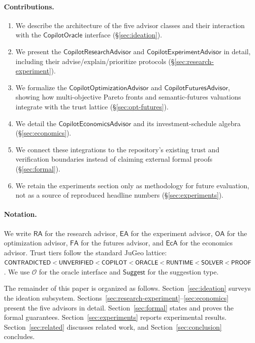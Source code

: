 \documentclass[11pt]{article}
\newcommand{\RA}{\mathsf{RA}}
\newcommand{\EA}{\mathsf{EA}}
\newcommand{\OA}{\mathsf{OA}}
\newcommand{\FA}{\mathsf{FA}}
\newcommand{\EcA}{\mathsf{EcA}}
\newcommand{\Oracle}{\mathcal{O}}
\newcommand{\Suggest}{\mathsf{Suggest}}
\begin{document}
\paragraph{Contributions.}
\begin{enumerate}
  \item We describe the architecture of the five advisor classes
        and their interaction with the
        $\mathsf{CopilotOracle}$ interface
        (\S\ref{sec:ideation}).
  \item We present the $\mathsf{CopilotResearchAdvisor}$ and
        $\mathsf{CopilotExperimentAdvisor}$ in detail, including
        their advise/explain/prioritize protocols
        (\S\ref{sec:research-experiment}).
  \item We formalize the $\mathsf{CopilotOptimizationAdvisor}$
        and $\mathsf{CopilotFuturesAdvisor}$, showing how
        multi-objective Pareto fronts and semantic-futures
        valuations integrate with the trust lattice
        (\S\ref{sec:opt-futures}).
  \item We detail the $\mathsf{CopilotEconomicsAdvisor}$ and its
        investment-schedule algebra
        (\S\ref{sec:economics}).
  \item We connect these integrations to the repository's existing trust
        and verification boundaries instead of claiming external formal
        proofs (\S\ref{sec:formal}).
  \item We retain the experiments section only as methodology for future
        evaluation, not as a source of reproduced headline numbers
        (\S\ref{sec:experiments}).
\end{enumerate}

\paragraph{Notation.}
We write $\RA$ for the research advisor, $\EA$ for the experiment
advisor, $\OA$ for the optimization advisor, $\FA$ for the
futures advisor, and $\EcA$ for the economics advisor.  Trust
tiers follow the standard JuGeo lattice:
$\mathsf{CONTRADICTED} < \mathsf{UNVERIFIED} < \mathsf{COPILOT} < \mathsf{ORACLE} < \mathsf{RUNTIME} <
\mathsf{SOLVER} < \mathsf{PROOF}$.  We use $\Oracle$ for the oracle interface
and $\Suggest$ for the suggestion type.

The remainder of this paper is organized as follows.
Section~\ref{sec:ideation} surveys the ideation subsystem.
Sections~\ref{sec:research-experiment}--\ref{sec:economics}
present the five advisors in detail.
Section~\ref{sec:formal} states and proves the formal guarantees.
Section~\ref{sec:experiments} reports experimental results.
Section~\ref{sec:related} discusses related work, and
Section~\ref{sec:conclusion} concludes.
\end{document}
